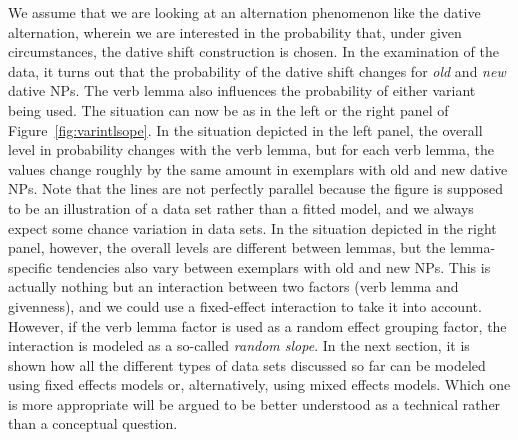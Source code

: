 We assume that we are looking at an alternation phenomenon like the dative alternation, wherein we are interested in the probability that, under given circumstances, the dative shift construction is chosen.
In the examination of the data, it turns out that the probability of the dative shift changes for \textit{old} and \textit{new} dative NPs.
The verb lemma also influences the probability of either variant being used.
The situation can now be as in the left or the right panel of Figure~\ref{fig:varintlsope}.
In the situation depicted in the left panel, the overall level in probability changes with the verb lemma, but for each verb lemma, the values change roughly by the same amount in exemplars with old and new dative NPs.
Note that the lines are not perfectly parallel because the figure is supposed to be an illustration of a data set rather than a fitted model, and we always expect some chance variation in data sets.
In the situation depicted in the right panel, however, the overall levels are different between lemmas, but the lemma-specific tendencies also vary between exemplars with old and new NPs.
This is actually nothing but an interaction between two factors (verb lemma and givenness), and we could use a fixed-effect interaction to take it into account.
However, if the verb lemma factor is used as a random effect grouping factor, the interaction is modeled as a so-called \textit{random slope}.
In the next section, it is shown how all the different types of data sets discussed so far can be modeled using fixed effects models or, alternatively, using mixed effects models.
Which one is more appropriate will be argued to be better understood as a technical rather than a conceptual question.

